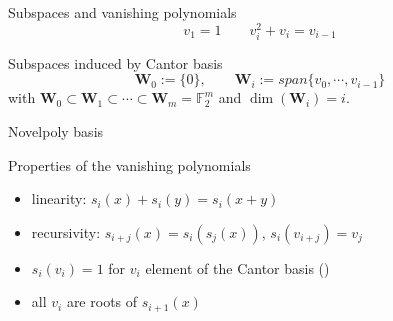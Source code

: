 \begin{frame}{Subspaces and vanishing polynomials}
    \begin{equation*}
        v_1 = 1 \qquad v_i^2+v_i = v_{i-1}
    \end{equation*}

    \begin{block}{Subspaces induced by Cantor basis}
        \begin{equation*}
            \mathbf{W}_0 := \{0\},\qquad \mathbf{W}_i := span\{v_0, \cdots, v_{i-1}\}
        \end{equation*}
        \vspace{5pt}
        with $\mathbf{W}_0 \subset \mathbf{W}_1 \subset \cdots \subset \mathbf{W}_m = \mathds{F}_2^m$ and $\dim(\mathbf{W}_i) = i$.
    \end{block}
\end{frame}

\begin{frame}{Novelpoly basis}
    \begin{block}{Properties of the vanishing polynomials}
        \begin{itemize}
            \item linearity: $s_i(x) + s_i(y) = s_i(x+y)$
            \item recursivity: $s_{i+j}(x) = s_i(s_j(x))$, $s_i(v_{i+j}) = v_j$
            \item $s_i(v_i) = 1$ for $v_i$ element of the Cantor basis (\cite{DBLP:journals/corr/abs-1708-09746})
            \item all $v_i$ are roots of $s_{i+1}(x)$
        \end{itemize}
    \end{block}
\end{frame}

